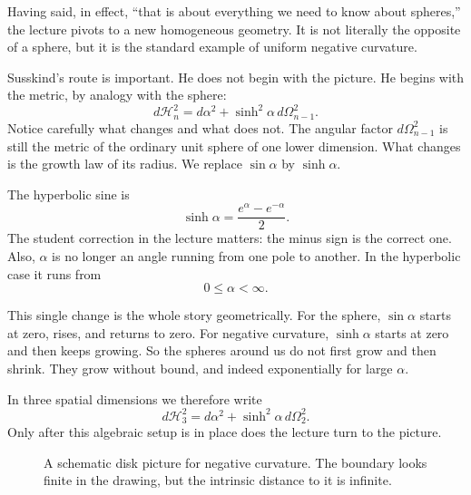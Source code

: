 Having said, in effect, ``that is about everything we need to know about spheres,'' the lecture pivots to a new homogeneous geometry. It is not literally the opposite of a sphere, but it is the standard example of uniform negative curvature.

Susskind's route is important. He does not begin with the picture. He begins with the metric, by analogy with the sphere:
\begin{equation}
d\mathcal H_n^2=d\alpha^2+\sinh^2\alpha\,d\Omega_{n-1}^2.
\end{equation}
Notice carefully what changes and what does not. The angular factor \(d\Omega_{n-1}^2\) is still the metric of the ordinary unit sphere of one lower dimension. What changes is the growth law of its radius. We replace \(\sin\alpha\) by \(\sinh\alpha\).

The hyperbolic sine is
\begin{equation}
\sinh\alpha=\frac{e^\alpha-e^{-\alpha}}{2}.
\end{equation}
The student correction in the lecture matters: the minus sign is the correct one. Also, \(\alpha\) is no longer an angle running from one pole to another. In the hyperbolic case it runs from
\begin{equation}
0\leq \alpha < \infty.
\end{equation}

This single change is the whole story geometrically. For the sphere, \(\sin\alpha\) starts at zero, rises, and returns to zero. For negative curvature, \(\sinh\alpha\) starts at zero and then keeps growing. So the spheres around us do not first grow and then shrink. They grow without bound, and indeed exponentially for large \(\alpha\).

In three spatial dimensions we therefore write
\begin{equation}
d\mathcal H_3^2=d\alpha^2+\sinh^2\alpha\,d\Omega_2^2.
\end{equation}
Only after this algebraic setup is in place does the lecture turn to the picture.

\begin{figure}[htbp]
\centering
{}
\caption{A schematic disk picture for negative curvature. The boundary looks finite in the drawing, but the intrinsic distance to it is infinite.}
\end{figure}

